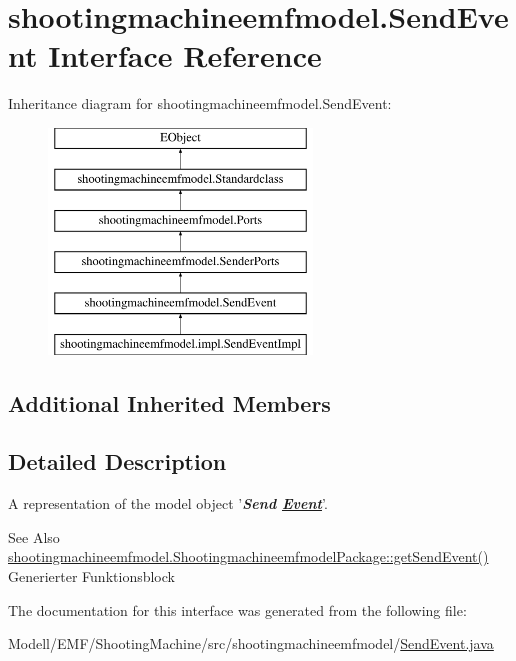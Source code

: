 \hypertarget{interfaceshootingmachineemfmodel_1_1_send_event}{\section{shootingmachineemfmodel.\-Send\-Event Interface Reference}
\label{interfaceshootingmachineemfmodel_1_1_send_event}
}
Inheritance diagram for shootingmachineemfmodel.\-Send\-Event\-:\begin{figure}[H]
\begin{center}
\leavevmode
\includegraphics[height=6.000000cm]{interfaceshootingmachineemfmodel_1_1_send_event}
\end{center}
\end{figure}
\subsection*{Additional Inherited Members}


\subsection{Detailed Description}
A representation of the model object '{\itshape {\bfseries Send \hyperlink{interfaceshootingmachineemfmodel_1_1_event}{Event}}}'.

\begin{DoxySeeAlso}{See Also}
\hyperlink{interfaceshootingmachineemfmodel_1_1_shootingmachineemfmodel_package_a9b3c1f7ef3f15aa8f3df8f7027ac90a1}{shootingmachineemfmodel.\-Shootingmachineemfmodel\-Package\-::get\-Send\-Event()}  Generierter Funktionsblock 
\end{DoxySeeAlso}


The documentation for this interface was generated from the following file\-:\begin{DoxyCompactItemize}
\item 
Modell/\-E\-M\-F/\-Shooting\-Machine/src/shootingmachineemfmodel/\hyperlink{_send_event_8java}{Send\-Event.\-java}\end{DoxyCompactItemize}
